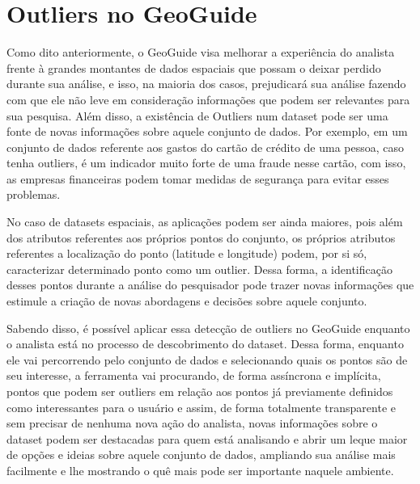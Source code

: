 \section{Outliers no GeoGuide}

Como dito anteriormente, o GeoGuide visa melhorar a experiência do analista frente à grandes montantes de dados espaciais que possam o deixar perdido durante sua análise, e isso, na maioria dos casos, prejudicará sua análise fazendo com que ele não leve em consideração informações que podem ser relevantes para sua pesquisa. Além disso, a existência de Outliers num dataset pode ser uma fonte de novas informações sobre aquele conjunto de dados. Por exemplo, em um conjunto de dados referente aos gastos do cartão de crédito de uma pessoa, caso tenha outliers, é um indicador muito forte de uma fraude nesse cartão, com isso, as empresas financeiras podem tomar medidas de segurança para evitar esses problemas.

No caso de datasets espaciais, as aplicações podem ser ainda maiores, pois além dos atributos referentes aos próprios pontos do conjunto, os próprios atributos referentes a localização do ponto (latitude e longitude) podem, por si só, caracterizar determinado ponto como um outlier. Dessa forma, a identificação desses pontos durante a análise do pesquisador pode trazer novas informações que estimule a criação de novas abordagens e decisões sobre aquele conjunto.

Sabendo disso, é possível aplicar essa detecção de outliers no GeoGuide enquanto o analista está no processo de descobrimento do dataset. Dessa forma, enquanto ele vai percorrendo pelo conjunto de dados e selecionando quais os pontos são de seu interesse, a ferramenta vai procurando, de forma assíncrona e implícita, pontos que podem ser outliers em relação aos pontos já previamente definidos como interessantes para o usuário e assim, de forma totalmente transparente e sem precisar de nenhuma nova ação do analista, novas informações sobre o dataset podem ser destacadas para quem está analisando e abrir um leque maior de opções e ideias sobre aquele conjunto de dados, ampliando sua análise mais facilmente e lhe mostrando o quê mais pode ser importante naquele ambiente.

